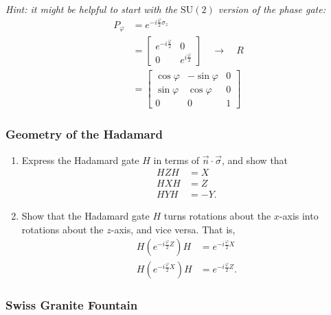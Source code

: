 \documentclass[fleqn]{article}
\begin{document}
\emph{Hint: it might be helpful to start with the \(\mathrm{SU}(2)\) version of the phase gate:}
\[
  \begin{aligned}
    P_\varphi
    &= e^{-i\frac{\varphi}{2}\sigma_z}
  \\&= \begin{bmatrix}
      e^{-i \frac{\varphi}{2}}& 0
    \\0 & e^{i \frac{\varphi}{2}}
    \end{bmatrix}
    \quad\longrightarrow\quad
    R
  \\&= \begin{bmatrix}
      \cos \varphi & -\sin \varphi & 0
    \\\sin \varphi & \cos \varphi & 0
    \\0 & 0 & 1
    \end{bmatrix}
  \end{aligned}
\]

\hypertarget{geometry-of-the-hadamard}{%
\subsubsection{Geometry of the Hadamard}\label{geometry-of-the-hadamard}}

\begin{enumerate}
\def\labelenumi{\arabic{enumi}.}
\item
  Express the Hadamard gate \(H\) in terms of \(\vec{n}\cdot\vec{\sigma}\), and show that
  \[
    \begin{aligned}
   HZH&=X
    \\HXH&=Z
    \\HYH&=-Y.
    \end{aligned}
  \]
\item
  Show that the Hadamard gate \(H\) turns rotations about the \(x\)-axis into rotations about the \(z\)-axis, and vice versa.
  That is,
  \[
     \begin{aligned}
       H \left(
         e^{-i\frac{\varphi}{2}Z}
       \right) H
       &= e^{-i\frac{\varphi}{2}X}
     \\H \left(
         e^{-i\frac{\varphi}{2}X}
       \right) H
       &= e^{-i\frac{\varphi}{2}Z}.
     \end{aligned}
   \]
\end{enumerate}

\hypertarget{swiss-granite-fountain}{%
\subsubsection{Swiss Granite Fountain}\label{swiss-granite-fountain}}
\end{document}
